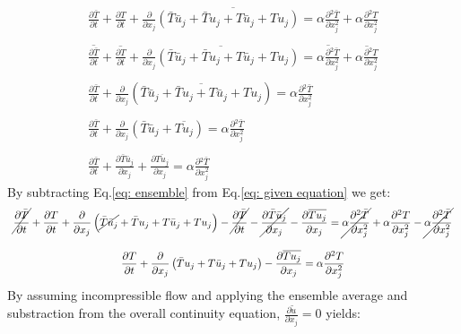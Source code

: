 \documentclass[11pt, a4paper]{article}
\newcommand{\parder}[2]{\frac{\partial {#1}}{\partial {#2}}}
\begin{document}
\begin{equation}
    \begin{array}{c}
        \overline{\displaystyle \parder{\bar{T}}{t}+\parder{T}{t}+\parder{}{x_j}\left(\bar{T}\bar{u}_j+\bar{T}u_j+T\bar{u}_j+Tu_j\right)=\displaystyle \alpha\parder{^2\bar{T}}{x^2_j}+\alpha\parder{^2T}{x^2_j}} \\\\
        \overline{\displaystyle \parder{\bar{T}}{t}}+\overline{\displaystyle\parder{T}{t}}+\overline{\displaystyle\parder{}{x_j}\left(\bar{T}\bar{u}_j+\bar{T}u_j+T\bar{u}_j+Tu_j\right)}=\overline{\displaystyle \alpha\parder{^2\bar{T}}{x^2_j}}+\overline{\displaystyle\alpha\parder{^2T}{x^2_j}} \\\\
        \displaystyle \parder{\bar{T}}{t}+\displaystyle\parder{}{x_j}\left(\overline{\bar{T}\bar{u}_j+\bar{T}u_j+T\bar{u}_j+Tu_j}\right)=\displaystyle \alpha\parder{^2\bar{T}}{x^2_j} \\\\
        \displaystyle \parder{\bar{T}}{t}+\displaystyle\parder{}{x_j}\left(\bar{T}\bar{u}_j+\overline{Tu_j}\right)=\displaystyle \alpha\parder{^2\bar{T}}{x^2_j} \\\\
        \displaystyle \parder{\bar{T}}{t}+\displaystyle\parder{\bar{T}\bar{u}_j}{x_j}+\parder{\overline{Tu_j}}{x_j}=\displaystyle \alpha\parder{^2\bar{T}}{x^2_j}
        \label{eq: ensemble}
    \end{array}
\end{equation}
By subtracting Eq.\ref{eq: ensemble} from Eq.\ref{eq: given equation} we get:
\begin{equation}
    \begin{array}{c}
        \displaystyle \cancel{\parder{\bar{T}}{t}}+\parder{T}{t}+\parder{}{x_j}\left(\cancel{\bar{T}\bar{u}_j}+\bar{T}u_j+T\bar{u}_j+Tu_j\right)-\cancel{\parder{\bar{T}}{t}}-\cancel{\parder{\bar{T}\bar{u}_j}{x_j}}-\parder{\overline{Tu_j}}{x_j}=\cancel{\alpha\parder{^2\bar{T}}{x^2_j}}+\alpha\parder{^2T}{x^2_j}-\cancel{\alpha\parder{^2\bar{T}}{x^2_j}} \\\\
        \displaystyle \parder{T}{t}+\parder{}{x_j}\left(\bar{T}u_j+T\bar{u}_j+Tu_j\right)-\parder{\overline{Tu_j}}{x_j}=\alpha\parder{^2T}{x^2_j}
        \label{eq: subtraction equation}
    \end{array}
\end{equation}
By assuming incompressible flow and applying the ensemble average and substraction from the overall continuity equation, $\displaystyle\parder{\tilde{u}}{x_j}=0$ yields: %
\end{document}
